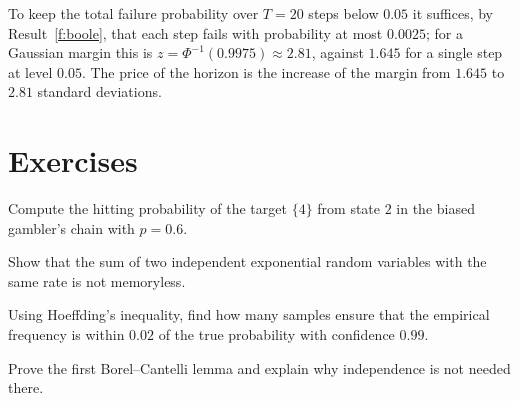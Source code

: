 \begin{example}\label{f:ex-boole}
To keep the total failure probability over $T=20$ steps below $0.05$ it suffices, by Result~\ref{f:boole}, that each step fails with probability at most $0.0025$; for a Gaussian margin this is $z=\Phi^{-1}(0.9975)\approx2.81$, against $1.645$ for a single step at level $0.05$. The price of the horizon is the increase of the margin from $1.645$ to $2.81$ standard deviations.
\end{example}

\section*{Exercises}

\begin{exercise}
Compute the hitting probability of the target $\{4\}$ from state $2$ in the biased gambler's chain with $p=0.6$.
\end{exercise}
\begin{exercise}
Show that the sum of two independent exponential random variables with the same rate is not memoryless.
\end{exercise}
\begin{exercise}
Using Hoeffding's inequality, find how many samples ensure that the empirical frequency is within $0.02$ of the true probability with confidence $0.99$.
\end{exercise}
\begin{exercise}
Prove the first Borel--Cantelli lemma and explain why independence is not needed there.
\end{exercise}
